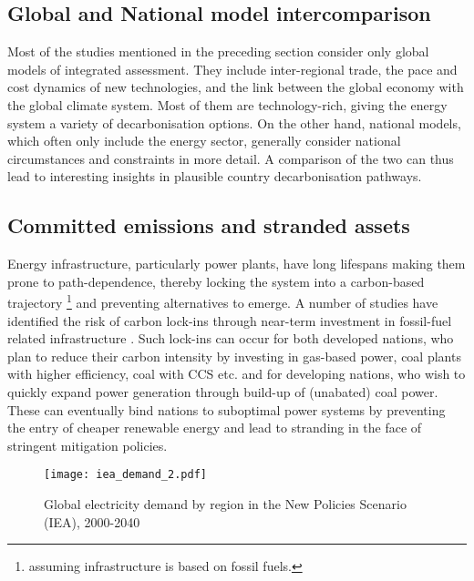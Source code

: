 \documentclass[../thesis.tex]{subfiles}
\begin{document}
\subsection{Global and National model intercomparison}\label{subsec:glonat}
Most of the studies mentioned in the preceding section consider only global models of integrated assessment. They include inter-regional trade, the pace and cost dynamics of new technologies, and the link between the global economy with the global climate system. Most of them are technology-rich, giving the energy system a variety of decarbonisation options. On the other hand, national models, which often only include the energy sector, generally consider national circumstances and constraints in more detail. A comparison of the two can thus lead to interesting insights in plausible country decarbonisation pathways.

\subsection{Committed emissions and stranded assets}\label{subsec:comm_stranded}

Energy infrastructure, particularly power plants, have long lifespans making them prone to path-dependence, thereby locking the system into a carbon-based trajectory \footnote{assuming infrastructure is based on fossil fuels.} and preventing alternatives to emerge. A number of studies have identified the risk of carbon lock-ins through near-term investment in fossil-fuel related infrastructure \citep[see e.g.,][]{bertramlockin2015,erickson2015,johnson2015}. Such lock-ins can occur for both developed nations, who plan to reduce their carbon intensity by investing in gas-based power, coal plants with higher efficiency, coal with CCS etc. and for developing nations, who wish to quickly expand power generation through build-up of (unabated) coal power. These can eventually bind nations to suboptimal power systems by preventing the entry of cheaper renewable energy and lead to stranding in the face of stringent mitigation policies. 

\begin{figure}[hbtp]
\centering
\texttt{[image: iea\_demand\_2.pdf]}
\caption{Global electricity demand by region in the New Policies Scenario (IEA), 2000-2040 \citep{iea2019}}
\label{fig:iea_future}
\end{figure}
\end{document}
